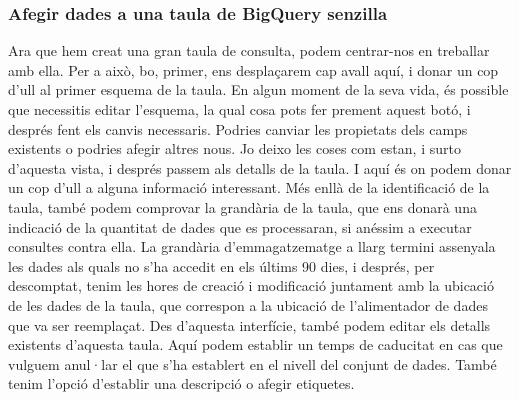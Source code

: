 \documentclass[12pt,longbibliography]{article}
\theoremstyle{definition}
\theoremstyle{remark}
\begin{document}
\subsubsection{Afegir dades a una taula de BigQuery senzilla}

Ara que hem creat una gran taula de consulta, podem centrar-nos en treballar amb ella. Per a això, bo, primer, ens desplaçarem cap avall aquí, i donar un cop d'ull al primer esquema de la taula. En algun moment de la seva vida, és possible que necessitis editar l'esquema, la qual cosa pots fer prement aquest botó, i després fent els canvis necessaris. Podries canviar les propietats dels camps existents o podries afegir altres nous. Jo deixo les coses com estan, i surto d'aquesta vista, i després passem als detalls de la taula. I aquí és on podem donar un cop d'ull a alguna informació interessant. Més enllà de la identificació de la taula, també podem comprovar la grandària de la taula, que ens donarà una indicació de la quantitat de dades que es processaran, si anéssim a executar consultes contra ella. La grandària d'emmagatzematge a llarg termini assenyala les dades als quals no s'ha accedit en els últims 90 dies, i després, per descomptat, tenim les hores de creació i modificació juntament amb la ubicació de les dades de la taula, que correspon a la ubicació de l'alimentador de dades que va ser reemplaçat. Des d'aquesta interfície, també podem editar els detalls existents d'aquesta taula. Aquí podem establir un temps de caducitat en cas que vulguem anul·lar el que s'ha establert en el nivell del conjunt de dades. També tenim l'opció d'establir una descripció o afegir etiquetes.
\end{document}
